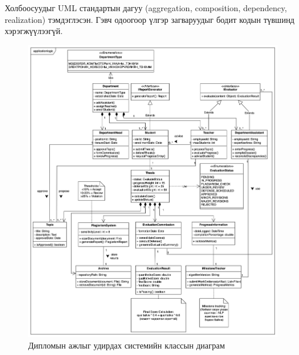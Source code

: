 Холбоосуудыг UML стандартын дагуу (aggregation, composition, dependency, realization) тэмдэглэсэн. Гэвч одоогоор үлгэр загваруудыг бодит кодын түвшинд хэрэгжүүлээгүй.
\begin{figure}
	\centering
	\includegraphics[width=17cm]{images/image.png}
	\caption{Дипломын ажлыг удирдах системийн классын диаграм}
	\label{fig:image}
\end{figure}